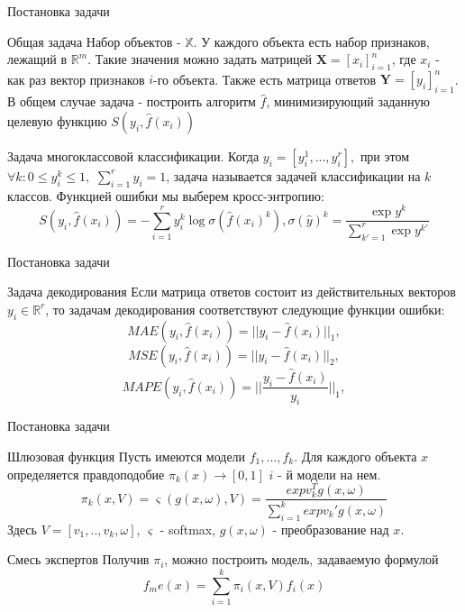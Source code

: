 \documentclass{beamer}
\begin{document}
\begin{frame}{Постановка задачи}
\begin{block}{Общая задача}
Набор объектов - $\mathbb{X}$.  У каждого объекта есть набор признаков,  лежащий в $\mathbb{R}^m$.  Такие значения можно задать матрицей 
$\mathbf{X} = [x_i]_{i = 1}^n$, где $x_i$ -  как раз вектор признаков $i$-го объекта. Также есть матрица ответов $\mathbf{Y} = [y_i]_{i = 1}^n$.  В общем случае задача - построить алгоритм $\hat{f}$, минимизирующий заданную целевую функцию $S(y_i, \hat{f}(x_i)) $
\end{block}

\begin{block}{Задача многоклассовой классификации.}
Когда $ y_i = [y_i^1, ..., y_i^r],$ при этом $ \forall k: 0 \leq y_i^k  \leq 1,$
$ \sum\limits_{i = 1}^r y_i = 1$, задача называется задачей классификации на $k$ классов. Функцией ошибки мы выберем  кросс-энтропию: 
$$S(y_i, \hat{f}(x_i)) =  - \sum\limits_{i=1}^r y_i^k \log \sigma(\hat{f}(x_i)^k), \sigma (\hat{y})^k = \frac{\exp y^k}{\sum\limits_{k' = 1}^{r} \exp y^{k'}} $$
\end{block}

\end{frame}

\begin{frame}{Постановка задачи}
\begin{block}{Задача декодирования}
Если матрица ответов состоит из действительных векторов  $y_i \in \mathbb{R}^r$, то задачам декодирования соответствуют следующие функции ошибки:
$$MAE(y_i, \hat{f}(x_i)) = || y_i - \hat{f}(x_i) ||_1,$$
$$MSE(y_i, \hat{f}(x_i)) = || y_i - \hat{f}(x_i) ||_2,$$
$$MAPE(y_i, \hat{f}(x_i)) = ||\frac{ y_i - \hat{f}(x_i)}{y_i} ||_1,$$
\end{block}

\end{frame}

\begin{frame}{Постановка задачи}


\begin{block}{Шлюзовая функция}
Пусть имеются модели $f_1, ..., f_k$.   Для каждого объекта $x$ определяется правдоподобие $\pi_k(x) \rightarrow [0, 1]$ $i$ - й модели на нем. 
$$ \pi_k(x, V) = \varsigma(g(x, \omega), V) = \frac{exp v^T_k g(x, \omega)}{\sum\limits_{i = 1}^k exp v_k' g(x, \omega)}$$
Здесь  $V = [v_1, .., v_k, \omega]$, $\varsigma$ - softmax, $g(x, \omega)$ - преобразование над $x$.
\end{block}


\begin{block}{Смесь экспертов}
Получив $\pi_i$, можно построить модель, задаваемую формулой 
$$ f_me(x) = \sum\limits_{i =1}^{k} \pi_i(x, V) f_i(x)$$
\end{block}

\end{frame}
\end{document}

